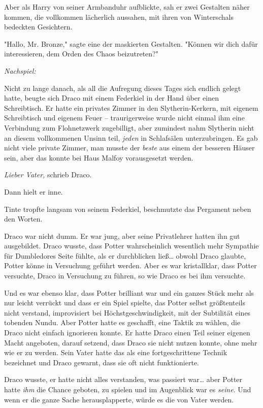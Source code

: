 {Aber als Harry von seiner Armbanduhr aufblickte, sah er zwei Gestalten näher kommen, die vollkommen lächerlich aussahen, mit ihren von Winterschals bedeckten Gesichtern.

"Hallo, Mr. Bronze," sagte eine der maskierten Gestalten. "Können wir dich dafür interessieren, dem Orden des Chaos beizutreten?"

\later

\emph{Nachspiel:}

Nicht zu lange danach, als all die Aufregung dieses Tages sich endlich gelegt hatte, beugte sich Draco mit einem Federkiel in der Hand über einen Schreibtisch. Er hatte ein privates Zimmer in den Slytherin-Kerkern, mit eigenem Schreibtisch und eigenem Feuer -- traurigerweise wurde nicht einmal ihm eine Verbindung zum Flohnetzwerk zugebilligt, aber zumindest nahm Slytherin nicht an diesem vollkommenen Unsinn teil, \emph{jeden} in Schlafsälen unterzubringen. Es gab nicht viele private Zimmer, man musste der \emph{beste} aus einem der besseren Häuser sein, aber das konnte bei Haus Malfoy vorausgesetzt werden.

\emph{Lieber Vater,} schrieb Draco.

Dann hielt er inne.

Tinte tropfte langsam von seinem Federkiel, beschmutzte das Pergament neben den Worten.

Draco war nicht dumm. Er war jung, aber seine Privatlehrer hatten ihn gut ausgebildet. Draco wusste, dass Potter wahrscheinlich wesentlich mehr Sympathie für Dumbledores Seite fühlte, als er durchblicken ließ… obwohl Draco glaubte, Potter könne in Versuchung geführt werden. Aber es war kristallklar, dass Potter versuchte, Draco in Versuchung zu führen, so wie Draco es bei ihm versuchte.

Und es war ebenso klar, dass Potter brilliant war und ein ganzes Stück mehr als nur leicht verrückt und dass er ein Spiel spielte, das Potter selbst größtenteils nicht verstand, improvisiert bei Höchstgeschwindigkeit, mit der Subtilität eines tobenden Nundu. Aber Potter hatte es geschafft, eine Taktik zu wählen, die Draco nicht einfach ignorieren konnte. Er hatte Draco einen Teil seiner eigenen Macht angeboten, darauf setzend, dass Draco sie nicht nutzen konnte, ohne mehr wie er zu werden. Sein Vater hatte das als eine fortgeschrittene Technik bezeichnet und Draco gewarnt, dass sie oft nicht funktionierte.

Draco wusste, er hatte nicht alles verstanden, was passiert war… aber Potter hatte \emph{ihm} die Chance geboten, zu spielen und im Augenblick war es \emph{seine}. Und wenn er die ganze Sache herausplapperte, würde es die von Vater werden.

}
